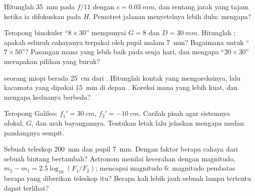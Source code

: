 \begin{exercise}[$\star\star$]\label{exo:b1:optical-instruments:8}
Hitunglah   \qty{35}{mm} pada $f/11$ dengan
$c = \qty{0.03}{mm}$, dan rentang jarak yang tajam ketika ia
difokuskan pada $H$. Pemotret jalanan menyetelnya lebih dulu: mengapa?
\end{exercise}

\begin{exercise}[$\star\star$]\label{exo:b1:optical-instruments:9}
Teropong binokuler ``$8\times30$'' mempunyai $G = 8$ dan
$D = \qty{30}{mm}$. Hitunglah ; apakah seluruh cahayanya
terpakai oleh pupil malam \qty{7}{mm}? Bagaimana untuk ``$7\times50$''?
Pasangan mana yang lebih baik pada senja hari, dan mengapa
``$20\times30$'' merupakan pilihan yang buruk?
\end{exercise}

\begin{exercise}[$\star\star\star$]\label{exo:b1:optical-instruments:10}
 seorang miopi berada \qty{25}{cm} dari . Hitunglah
  kontak yang mengoreksinya, lalu   kacamata
yang dipakai \qty{15}{mm} di depan . Koreksi mana yang lebih
kuat, dan mengapa keduanya berbeda?
\end{exercise}

\begin{exercise}[$\star\star\star$]\label{exo:b1:optical-instruments:11}
Teropong Galileo: $f_1' = \qty{30}{cm}$, $f_2' = \qty{-10}{cm}$.
Carilah pisah  agar sistemnya afokal, $G$, dan arah bayangannya.
Tentukan letak  lalu jelaskan mengapa medan pandangnya sempit.
\end{exercise}

\begin{exercise}[$\star\star\star$]\label{exo:b1:optical-instruments:12}
Sebuah teleskop \qty{200}{mm} dan pupil \qty{7}{mm}. Dengan faktor
berapa cahaya dari sebuah bintang bertambah? Astronom menilai kecerahan
dengan magnitudo, $m_2 - m_1 = 2.5\log_{10}(F_1/F_2)$;  mencapai
magnitudo $6$: magnitudo pembatas berapa yang diberikan teleskop itu?
Berapa kali lebih jauh sebuah lampu tertentu dapat terlihat?
\end{exercise}

